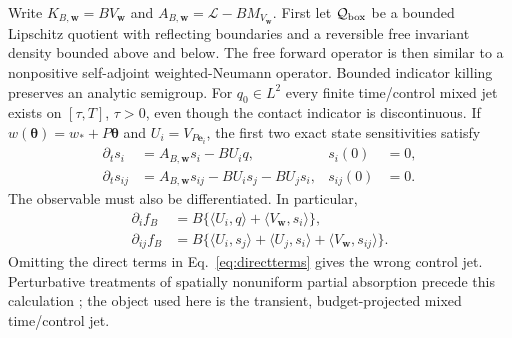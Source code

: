 \documentclass[aps,physrev,reprint,amsmath,amssymb,longbibliography,floatfix]{revtex4-2}
\newcommand{\Lfree}{\mathcal L}
\begin{document}
Write $K_{B,\bm w}=BV_{\bm w}$ and
$A_{B,\bm w}=\Lfree-BM_{V_{\bm w}}$.  First let $\mathcal Q_{\rm box}$ be a
bounded Lipschitz quotient with reflecting boundaries and a reversible free
invariant density bounded above and below.  The free forward operator is then
similar to a nonpositive self-adjoint weighted-Neumann operator.  Bounded
indicator killing preserves an analytic semigroup.  For $q_0\in L^2$ every
finite time/control mixed jet exists on
$[\tau,T]$, $\tau>0$, even though the contact indicator is discontinuous.
If $w(\bm\theta)=w_*+P\bm\theta$ and $U_i=V_{P\bm e_i}$, the first two exact
state sensitivities satisfy
\begin{align}
 \partial_t s_i&=A_{B,\bm w}s_i-BU_iq,&s_i(0)&=0,\nonumber\\
 \partial_t s_{ij}&=A_{B,\bm w}s_{ij}-BU_is_j-BU_js_i,
 &s_{ij}(0)&=0.
\label{eq:sensitivitypde}
\end{align}
The observable must also be differentiated.  In particular,
\begin{align}
 \partial_i f_B&=B\{\langle U_i,q\rangle
                  +\langle V_{\bm w},s_i\rangle\},\nonumber\\
 \partial_{ij}f_B&=B\{\langle U_i,s_j\rangle+\langle U_j,s_i\rangle
                  +\langle V_{\bm w},s_{ij}\rangle\}.
\label{eq:directterms}
\end{align}
Omitting the direct terms in Eq.~\eqref{eq:directterms} gives the wrong
control jet.  Perturbative treatments of spatially nonuniform partial
absorption precede this calculation \cite{ryu2009inhomogeneous,
ryuJohnson2009nonuniform}; the object used here is the transient,
budget-projected mixed time/control jet.
\end{document}
